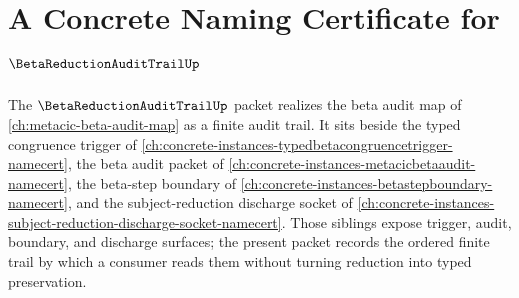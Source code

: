\chapter{A Concrete Naming Certificate for $\BetaReductionAuditTrailUp$}
\label{ch:concrete-instances-betareductionaudittrail-namecert}

The $\BetaReductionAuditTrailUp$ packet realizes the beta audit map of
\autoref{ch:metacic-beta-audit-map} as a finite audit trail. It sits beside
the typed congruence trigger of
\autoref{ch:concrete-instances-typedbetacongruencetrigger-namecert}, the beta
audit packet of \autoref{ch:concrete-instances-metacicbetaaudit-namecert}, the
beta-step boundary of \autoref{ch:concrete-instances-betastepboundary-namecert},
and the subject-reduction discharge socket of
\autoref{ch:concrete-instances-subject-reduction-discharge-socket-namecert}.
Those siblings expose trigger, audit, boundary, and discharge surfaces; the
present packet records the ordered finite trail by which a consumer reads them
without turning reduction into typed preservation.

